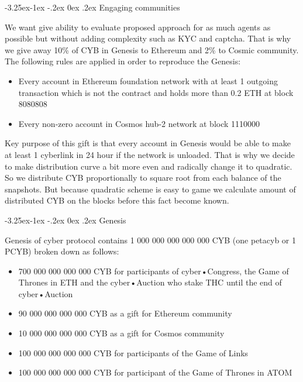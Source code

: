 \documentclass[8pt,oneside]{amsart}
\makeatletter
\renewcommand\subsection{\@startsection{subsection}{2}{\z@}%
                                     {-3.25ex\@plus -1ex \@minus -.2ex}%
                                     {0ex \@plus .2ex}%
                                     {\play\Large}}%
\newcommand{\titleSection}[1]{\subsection{#1}}
\newcommand{\code}[1]{{\PlayBold #1}}
\newenvironment{Figure}
  {\par\medskip\noindent\minipage{\linewidth}}
  {\endminipage\par\medskip}
\makeatother
\begin{document}
\titleSection{Engaging communities}\label{welcome}

We want give ability to evaluate proposed approach for as much agents as possible but without adding complexity such as KYC and captcha. That is why we give away 10\% of CYB in Genesis to Ethereum and 2\% to Cosmic community. The following rules are applied in order to reproduce the Genesis:
\begin{itemize}
\item Every account in Ethereum foundation network with at least 1 outgoing transaction which is not the contract and holds more than 0.2 ETH at block 8080808
\item Every non-zero account in Cosmos hub-2 network at block 1110000
\end{itemize}

Key purpose of this gift is that every account in Genesis would be able to make at least 1 cyberlink in 24 hour if the network is unloaded. That is why we decide to make distribution curve a bit more even and radically change it to quadratic. So we distribute CYB proportionally to square root from each balance of the snapshots. But because quadratic scheme is easy to game we calculate amount of distributed CYB on the blocks before this fact become known.

\titleSection{Genesis}\label{genesis}

Genesis of \code{cyber} protocol contains 1 000 000 000 000 000 CYB (one petacyb or 1 PCYB) broken down as follows:

\begin{itemize}
\item 700 000 000 000 000 CYB for participants of cyber•Congress, the Game of Thrones in ETH and the cyber•Auction who stake THC until the end of cyber•Auction
\item 90 000 000 000 000 CYB as a gift for Ethereum community
\item 10 000 000 000 000 CYB as a gift for Cosmos community
\item 100 000 000 000 000 CYB for participants of the Game of Links
\item 100 000 000 000 000 CYB for participant of the Game of Thrones in ATOM

\end{itemize}

\begin{Figure}
 \centering
 
\end{Figure}
\end{document}
